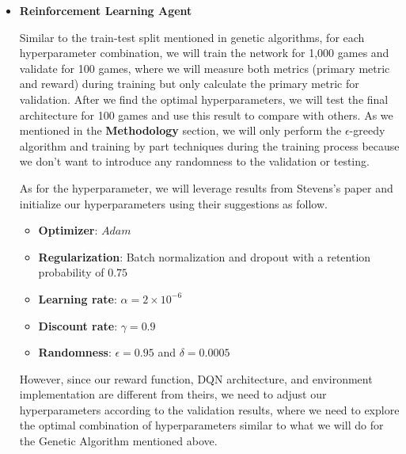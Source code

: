 \documentclass[letterpaper]{article} %
\begin{document}
\begin{itemize}
  

  \item \textbf{Reinforcement Learning Agent} 
  
  Similar to the train-test split mentioned in genetic algorithms, for each hyperparameter combination, we will train the network for 1,000 games and validate for 100 games, where we will measure both metrics (primary metric and reward) during training but only calculate the primary metric for validation. After we find the optimal hyperparameters, we will test the final architecture for 100 games and use this result to compare with others. As we mentioned in the {\bf Methodology} section, we will only perform the $\epsilon$-greedy algorithm and training by part techniques during the training process because we don't want to introduce any randomness to the validation or testing.
  
  As for the hyperparameter, we will leverage results from Stevens's paper \cite{Stevens_2016} and initialize our hyperparameters using their suggestions as follow. 
  
  \begin{itemize}
    \item {\bf Optimizer}: $Adam$
    \item {\bf Regularization}: Batch normalization and dropout with a retention probability of $0.75$
    \item {\bf Learning rate}: $\alpha = 2\times 10^{-6}$
    \item {\bf Discount rate}: $\gamma = 0.9$
    \item {\bf Randomness}: $\epsilon = 0.95$ and $\delta = 0.0005$
  \end{itemize}

  However, since our reward function, DQN architecture, and environment implementation are different from theirs, we need to adjust our hyperparameters according to the validation results, where we need to explore the optimal combination of hyperparameters similar to what we will do for the Genetic Algorithm mentioned above.


\end{itemize}
\end{document}
